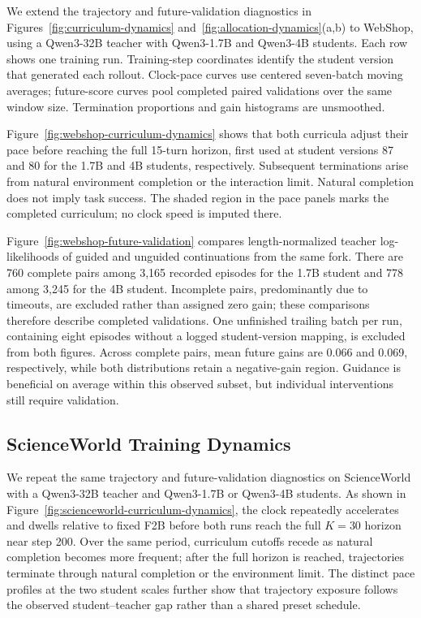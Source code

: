 \documentclass{article}
\begin{document}
We extend the trajectory and future-validation diagnostics in
Figures~\ref{fig:curriculum-dynamics} and~\ref{fig:allocation-dynamics}(a,b) to WebShop,
using a Qwen3-32B teacher with Qwen3-1.7B and Qwen3-4B students.
Each row shows one training run. Training-step coordinates identify the student version
that generated each rollout. Clock-pace curves use centered seven-batch moving averages;
future-score curves pool completed paired validations over the same window size.
Termination proportions and gain histograms are unsmoothed.

Figure~\ref{fig:webshop-curriculum-dynamics} shows that both curricula adjust their pace
before reaching the full 15-turn horizon, first used at student versions 87 and 80 for
the 1.7B and 4B students, respectively. Subsequent terminations arise from natural
environment completion or the interaction limit. Natural completion does not imply
task success. The shaded region in the pace panels marks the completed curriculum;
no clock speed is imputed there.

Figure~\ref{fig:webshop-future-validation} compares length-normalized teacher
log-likelihoods of guided and unguided continuations from the same fork.
There are 760 complete pairs among 3,165 recorded episodes for the 1.7B student and
778 among 3,245 for the 4B student. Incomplete pairs, predominantly due to timeouts,
are excluded rather than assigned zero gain; these comparisons therefore describe
completed validations. One unfinished trailing batch per run, containing eight
episodes without a logged student-version mapping, is excluded from both figures.
Across complete pairs, mean future gains are 0.066 and 0.069, respectively, while
both distributions retain a negative-gain region. Guidance is beneficial on average
within this observed subset, but individual interventions still require validation.

\subsection{ScienceWorld Training Dynamics}
\label{app:scienceworld-training-dynamics}

We repeat the same trajectory and future-validation diagnostics on ScienceWorld with a Qwen3-32B
teacher and Qwen3-1.7B or Qwen3-4B students.  As shown in
Figure~\ref{fig:scienceworld-curriculum-dynamics}, the clock repeatedly accelerates and dwells relative
to fixed F2B before both runs reach the full $K=30$ horizon near step 200.  Over the same period,
curriculum cutoffs recede as natural completion becomes more frequent; after the full horizon is
reached, trajectories terminate through natural completion or the environment limit.  The distinct
pace profiles at the two student scales further show that trajectory exposure follows the observed
student--teacher gap rather than a shared preset schedule.
\end{document}
